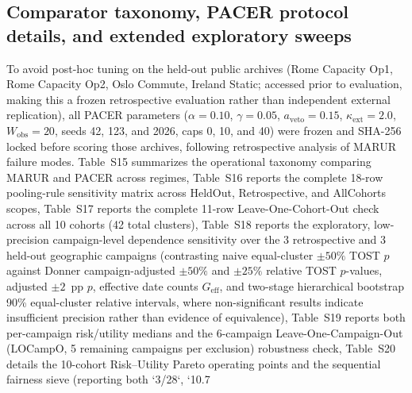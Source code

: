 \documentclass[journal,onecolumn,10pt]{IEEEtran}
\begin{document}
\subsection{Comparator taxonomy, PACER protocol details, and extended exploratory sweeps}
To avoid post-hoc tuning on the held-out public archives (Rome Capacity Op1, Rome Capacity Op2, Oslo Commute, Ireland Static; accessed prior to evaluation, making this a frozen retrospective evaluation rather than independent external replication), all PACER parameters ($\alpha=0.10$, $\gamma=0.05$, $a_{\text{veto}}=0.15$, $\kappa_{\text{ext}}=2.0$, $W_{\text{obs}}=20$, seeds 42, 123, and 2026, caps 0, 10, and 40) were frozen and SHA-256 locked before scoring those archives, following retrospective analysis of MARUR failure modes. Table~S15 summarizes the operational taxonomy comparing MARUR and PACER across regimes, Table~S16 reports the complete 18-row pooling-rule sensitivity matrix across HeldOut, Retrospective, and AllCohorts scopes, Table~S17 reports the complete 11-row Leave-One-Cohort-Out check across all 10 cohorts (42 total clusters), Table~S18 reports the exploratory, low-precision campaign-level dependence sensitivity over the 3 retrospective and 3 held-out geographic campaigns (contrasting naive equal-cluster $\pm 50\%$ TOST $p$ against Donner campaign-adjusted $\pm 50\%$ and $\pm 25\%$ relative TOST $p$-values, adjusted $\pm 2$~pp $p$, effective date counts $G_{\text{eff}}$, and two-stage hierarchical bootstrap 90\% equal-cluster relative intervals, where non-significant results indicate insufficient precision rather than evidence of equivalence), Table~S19 reports both per-campaign risk/utility medians and the 6-campaign Leave-One-Campaign-Out (LOCampO, 5 remaining campaigns per exclusion) robustness check, Table~S20 details the 10-cohort Risk--Utility Pareto operating points and the sequential fairness sieve (reporting both `3/28`, `10.7%
\end{document}
